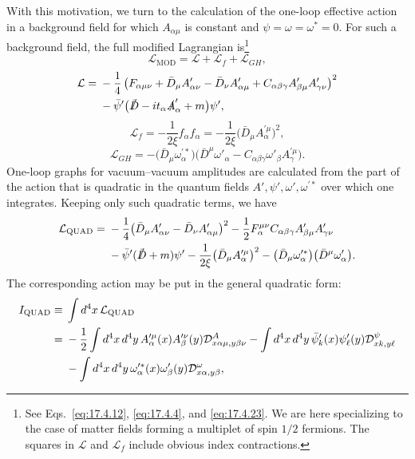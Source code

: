 With this motivation, we turn to the calculation of the one-loop effective
action in a background field for which $A_{\alpha\mu}$ is constant and
$\psi=\omega=\omega^*=0$. For such a background field, the full modified
Lagrangian is\footnote{See Eqs.~\eqref{eq:17.4.12}, \eqref{eq:17.4.4}, and
\eqref{eq:17.4.23}. We are here specializing to the case of matter fields
forming a multiplet of spin $1/2$ fermions. The squares in $\mathcal L$ and
$\mathcal L_f$ include obvious index contractions.}
\begin{equation}
\mathcal L_{\mathrm{MOD}}=\mathcal L+\mathcal L_f+\mathcal L_{GH},
\label{eq:17.5.1}
\end{equation}
\begin{align}
\mathcal L={}&-\frac14\left(F_{\alpha\mu\nu}+\bar D_\mu A'_{\alpha\nu}
-\bar D_\nu A'_{\alpha\mu}+C_{\alpha\beta\gamma}A_{\beta\mu}'A_{\gamma\nu}'\right)^2
\notag\\
&-\bar\psi'\bigl(\sl{\bar D}-it_\alpha\sl{A}'_\alpha+m\bigr)\psi',
\label{eq:17.5.2}
\end{align}
\begin{equation}
\mathcal L_f=-\frac{1}{2\xi}f_\alpha f_\alpha
=-\frac{1}{2\xi}\bigl(\bar D_\mu A_\alpha^{\prime\mu}\bigr)^2,
\label{eq:17.5.3}
\end{equation}
\begin{equation}
\mathcal L_{GH}=-\bigl(\bar D_\mu\omega_\alpha^{\prime *}\bigr)
\bigl(\bar D^\mu\omega'_\alpha
-C_{\alpha\beta\gamma}\omega'_\beta A_\gamma^{\prime\mu}\bigr).
\label{eq:17.5.4}
\end{equation}
One-loop graphs for vacuum--vacuum amplitudes are calculated from the
part of the action that is quadratic in the quantum fields
$A',\psi',\omega',\omega^{\prime *}$ over which one integrates. Keeping only
such quadratic terms, we have
\begin{align}
\mathcal L_{\mathrm{QUAD}}={}&-\frac14
\bigl(\bar D_\mu A'_{\alpha\nu}-\bar D_\nu A'_{\alpha\mu}\bigr)^2
-\frac12F_\alpha^{\mu\nu}C_{\alpha\beta\gamma}
A'_{\beta\mu}A'_{\gamma\nu}
\notag\\
&-\bar\psi'(\sl{\bar D}+m)\psi'
-\frac{1}{2\xi}\bigl(\bar D_\mu A_\alpha^{\prime\mu}\bigr)^2
-\bigl(\bar D_\mu\omega_\alpha^{\prime *}\bigr)
 \bigl(\bar D^\mu\omega'_\alpha\bigr).
\label{eq:17.5.5}
\end{align}
The corresponding action may be put in the general quadratic form:
\begin{align}
I_{\mathrm{QUAD}}\equiv{}&\int d^4x\,\mathcal L_{\mathrm{QUAD}}
\notag\\
={}&-\frac12\int d^4x\,d^4y\,
A_\alpha^{\prime\mu}(x)A_\beta^{\prime\nu}(y)
\mathcal D^A_{x\alpha\mu,y\beta\nu}
-\int d^4x\,d^4y\,\bar\psi'_k(x)\psi'_\ell(y)
\mathcal D^\psi_{xk,y\ell}
\notag\\
&-\int d^4x\,d^4y\,\omega_\alpha^{\prime *}(x)\omega'_\beta(y)
\mathcal D^\omega_{x\alpha,y\beta},
\label{eq:17.5.6}
\end{align}
